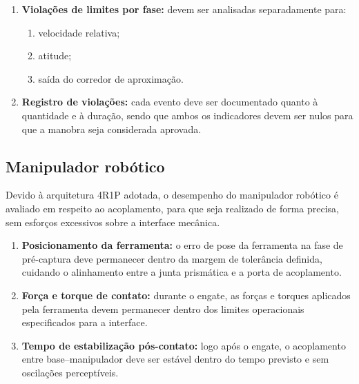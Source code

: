 \begin{enumerate}[label=(\roman*), leftmargin=*, itemsep=0pt]
\item \textbf{Violações de limites por fase:} devem ser analisadas separadamente para:
    \begin{enumerate}[label=(\alph*), itemsep=0pt]
    \item velocidade relativa;  
    \item atitude;  
    \item saída do corredor de aproximação.
    \end{enumerate}

\item \textbf{Registro de violações:} cada evento deve ser documentado quanto à quantidade e à duração, sendo que ambos os indicadores devem ser nulos para que a manobra seja considerada aprovada.
\end{enumerate}

\subsection{Manipulador robótico}

Devido à arquitetura 4R1P adotada, o desempenho do manipulador robótico é avaliado em respeito ao acoplamento, para que seja realizado de forma precisa, sem esforços excessivos sobre a interface mecânica.

\begin{enumerate}[label=(\roman*), leftmargin=*, itemsep=0pt]
\item \textbf{Posicionamento da ferramenta:} o erro de pose da ferramenta na fase de pré-captura deve permanecer dentro da margem de tolerância definida, cuidando o alinhamento entre a junta prismática e a porta de acoplamento.

\item \textbf{Força e torque de contato:} durante o engate, as forças e torques aplicados pela ferramenta devem permanecer dentro dos limites operacionais especificados para a interface.

\item \textbf{Tempo de estabilização pós-contato:} logo após o engate, o acoplamento entre base--manipulador deve ser estável dentro do tempo previsto e sem oscilações perceptíveis.
\end{enumerate}
